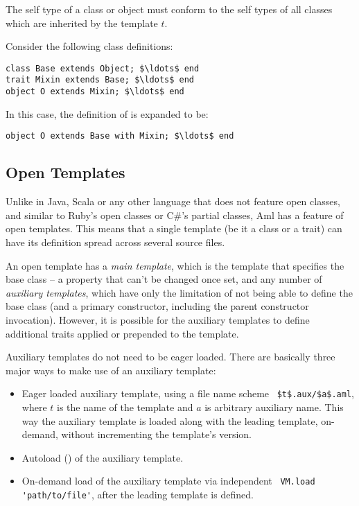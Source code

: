 The self type of a class or object must conform to the self types of all classes which are inherited by the template $t$. 

\example Consider the following class definitions:
\begin{lstlisting}
class Base extends Object; $\ldots$ end
trait Mixin extends Base; $\ldots$ end
object O extends Mixin; $\ldots$ end
\end{lstlisting}
In this case, the definition of  is expanded to be:
\begin{lstlisting}
object O extends Base with Mixin; $\ldots$ end
\end{lstlisting}





\subsection{Open Templates}
\label{sec:open-templates}

Unlike in Java, Scala or any other language that does not feature open classes, and similar to Ruby's open classes or C\#'s partial classes, Aml has a feature of open templates. This means that a single template (be it a class or a trait) can have its definition spread across several source files. 

An open template has a {\em main template}, which is the template that specifies the base class -- a property that can't be changed once set, and any number of {\em auxiliary templates}, which have only the limitation of not being able to define the base class (and a primary constructor, including the parent constructor invocation). However, it is possible for the auxiliary templates to define additional traits applied or prepended to the template. 

Auxiliary templates do not need to be eager loaded. There are basically three major ways to make use of an auxiliary template:
\begin{itemize}
  \item Eager loaded auxiliary template, using a file name scheme ~\lstinline!$t$.aux/$a$.aml!, where $t$ is the name of the template and $a$ is arbitrary auxiliary name. This way the auxiliary template is loaded along with the leading template, on-demand, without incrementing the template's version.
  \item Autoload () of the auxiliary template. 
  \item On-demand load of the auxiliary template via independent ~\lstinline[deletekeywords={to}]!VM.load 'path/to/file'!, after the leading template is defined.
\end{itemize}






